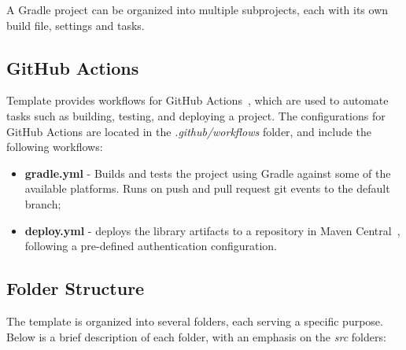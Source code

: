 A Gradle project can be organized into multiple subprojects, each with its own build file, settings and tasks.

\subsection{GitHub Actions}\label{subsec:github-actions}

Template provides workflows for GitHub Actions~\cite{github-actions}, which are used to automate tasks such as building, testing, and deploying a project.
The configurations for GitHub Actions are located in the \textit{.github/workflows} folder, and include the following workflows:

\begin{itemize}
    \item \textbf{gradle.yml} - Builds and tests the project using Gradle against some of the available platforms.
    Runs on push and pull request git events to the default branch;
    \item \textbf{deploy.yml} - deploys the library artifacts to a repository in Maven Central~\cite{maven-central}, following a pre-defined authentication configuration.
\end{itemize}

\subsection{Folder Structure}\label{subsec:folder-structure}

The template is organized into several folders, each serving a specific purpose.
Below is a brief description of each folder, with an emphasis on the \textit{src} folders:

